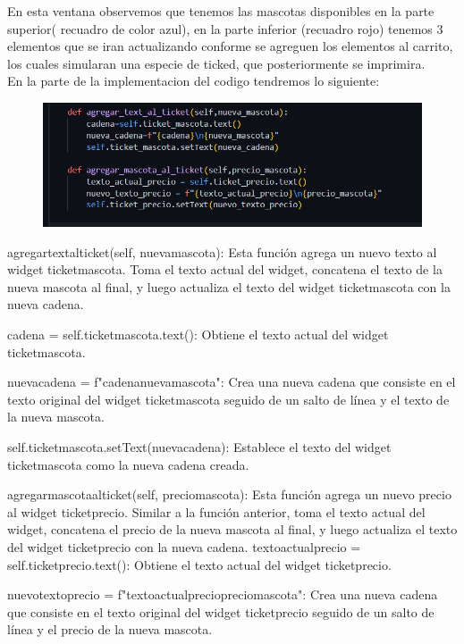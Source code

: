 \documentclass[11pt]{article}
\begin{document}
En esta ventana observemos que tenemos las mascotas disponibles en la parte superior( recuadro de color azul), en la parte inferior (recuadro rojo) tenemos 3 elementos que se iran actualizando conforme se agreguen los elementos al carrito, los cuales simularan una especie de ticked, que posteriormente se imprimira.\\
En la parte de la implementacion del codigo tendremos lo siguiente: 

\begin{figure}[H]
		\begin{center}
 			\includegraphics[width = .7\textwidth]{11.png}
 			
		\end{center} 
\end{figure}

agregartextalticket(self, nuevamascota): Esta función agrega un nuevo texto al widget ticketmascota. Toma el texto actual del widget, concatena el texto de la nueva mascota al final, y luego actualiza el texto del widget ticketmascota con la nueva cadena.

cadena = self.ticketmascota.text(): Obtiene el texto actual del widget ticketmascota.

nuevacadena = f"{cadena}{nuevamascota}": Crea una nueva cadena que consiste en el texto original del widget ticketmascota seguido de un salto de línea  y el texto de la nueva mascota.

self.ticketmascota.setText(nuevacadena): Establece el texto del widget ticketmascota como la nueva cadena creada.

agregarmascotaalticket(self, preciomascota): Esta función agrega un nuevo precio al widget ticketprecio. Similar a la función anterior, toma el texto actual del widget, concatena el precio de la nueva mascota al final, y luego actualiza el texto del widget ticketprecio con la nueva cadena.
textoactualprecio = self.ticketprecio.text(): Obtiene el texto actual del widget ticketprecio.

nuevotextoprecio = f"{textoactualprecio}{preciomascota}": Crea una nueva cadena que consiste en el texto original del widget ticketprecio seguido de un salto de línea  y el precio de la nueva mascota.
\end{document}
